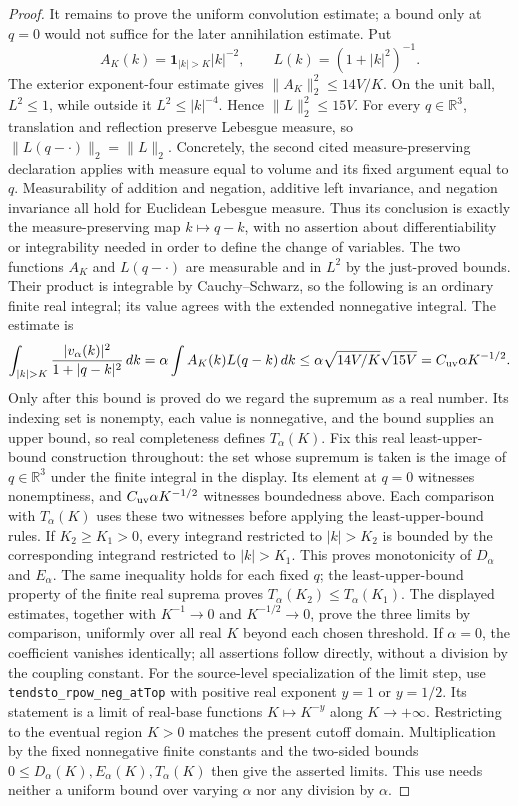 \documentclass[11pt,a4paper]{article}
\theoremstyle{definition}
\theoremstyle{remark}
\begin{document}
\begin{proof}
It remains to prove the uniform convolution estimate; a bound only at
$q=0$ would not suffice for the later annihilation estimate. Put
\[
 A_K(k)=\mathbf1_{|k|>K}|k|^{-2},\qquad L(k)=(1+|k|^2)^{-1}.
\]
The exterior exponent-four estimate gives
$\|A_K\|_2^2\leq14V/K$. On the unit ball, $L^2\leq1$, while
outside it $L^2\leq|k|^{-4}$. Hence $\|L\|_2^2\leq15V$.
For every $q\in\mathbb R^3$, translation and reflection preserve
Lebesgue measure, so $\|L(q-\cdot)\|_2=\|L\|_2$.
Concretely, the second cited measure-preserving declaration applies
with measure equal to volume and its fixed argument equal to $q$.
Measurability of addition and negation, additive left invariance,
and negation invariance all hold for Euclidean Lebesgue measure.
Thus its conclusion is exactly the measure-preserving map
$k\mapsto q-k$, with no assertion about differentiability or
integrability needed in order to define the change of variables.
The two functions $A_K$ and $L(q-\cdot)$ are measurable and in
$L^2$ by the just-proved bounds. Their product is integrable by
Cauchy--Schwarz, so the following is an ordinary finite real integral;
its value agrees with the extended nonnegative integral. The estimate is
\[
 \int_{|k|>K}\frac{|v_\alpha(k)|^2}{1+|q-k|^2}\,dk
 =\alpha\int A_K(k)L(q-k)\,dk
 \leq\alpha\sqrt{14V/K}\sqrt{15V}
 =C_{\rm uv}\alpha K^{-1/2}.
\]
Only after this bound is proved do we regard the supremum as a real
number. Its indexing set is nonempty, each value is nonnegative,
and the bound supplies an upper bound, so real completeness defines
$T_\alpha(K)$. Fix this real least-upper-bound construction throughout:
the set whose supremum is taken is the image of $q\in\mathbb R^3$
under the finite integral in the display. Its element at $q=0$
witnesses nonemptiness, and $C_{\rm uv}\alpha K^{-1/2}$ witnesses
boundedness above. Each comparison with $T_\alpha(K)$ uses these
two witnesses before applying the least-upper-bound rules.
If $K_2\geq K_1>0$, every integrand restricted to $|k|>K_2$
is bounded by the corresponding integrand restricted to $|k|>K_1$.
This proves monotonicity of $D_\alpha$ and $E_\alpha$. The same
inequality holds for each fixed $q$; the least-upper-bound property
of the finite real suprema proves $T_\alpha(K_2)\leq T_\alpha(K_1)$.
The displayed estimates, together with $K^{-1}\to0$ and
$K^{-1/2}\to0$, prove the three limits by comparison, uniformly over
all real $K$ beyond each chosen threshold. If
$\alpha=0$, the coefficient vanishes identically; all assertions follow
directly, without a division by the coupling constant.
For the source-level specialization of the limit step, use
\nolinkurl{tendsto_rpow_neg_atTop} with positive real exponent
$y=1$ or $y=1/2$. Its statement is a limit of real-base functions
$K\mapsto K^{-y}$ along $K\to+\infty$. Restricting to the
eventual region $K>0$ matches the present cutoff domain. Multiplication
by the fixed nonnegative finite constants and the two-sided bounds
$0\leq D_\alpha(K),E_\alpha(K),T_\alpha(K)$ then give the asserted
limits. This use needs neither a uniform bound over varying $\alpha$
nor any division by $\alpha$.
\end{proof}
\end{document}
